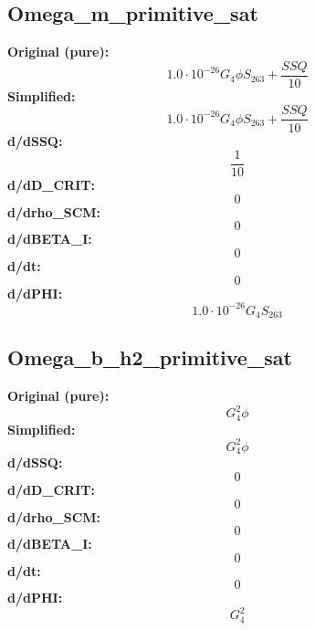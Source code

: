 \subsection{Omega_m_primitive_sat}
\textbf{Original (pure):}
\begin{equation}
1.0 \cdot 10^{-26} G_{4} \phi S_{26 3} + \frac{SSQ}{10}
\end{equation}
\textbf{Simplified:}
\begin{equation}
1.0 \cdot 10^{-26} G_{4} \phi S_{26 3} + \frac{SSQ}{10}
\end{equation}
\textbf{d/dSSQ:}
\begin{equation}
\frac{1}{10}
\end{equation}
\textbf{d/dD_CRIT:}
\begin{equation}
0
\end{equation}
\textbf{d/drho_SCM:}
\begin{equation}
0
\end{equation}
\textbf{d/dBETA_I:}
\begin{equation}
0
\end{equation}
\textbf{d/dt:}
\begin{equation}
0
\end{equation}
\textbf{d/dPHI:}
\begin{equation}
1.0 \cdot 10^{-26} G_{4} S_{26 3}
\end{equation}

\subsection{Omega_b_h2_primitive_sat}
\textbf{Original (pure):}
\begin{equation}
G_{4}^{2} \phi
\end{equation}
\textbf{Simplified:}
\begin{equation}
G_{4}^{2} \phi
\end{equation}
\textbf{d/dSSQ:}
\begin{equation}
0
\end{equation}
\textbf{d/dD_CRIT:}
\begin{equation}
0
\end{equation}
\textbf{d/drho_SCM:}
\begin{equation}
0
\end{equation}
\textbf{d/dBETA_I:}
\begin{equation}
0
\end{equation}
\textbf{d/dt:}
\begin{equation}
0
\end{equation}
\textbf{d/dPHI:}
\begin{equation}
G_{4}^{2}
\end{equation}

